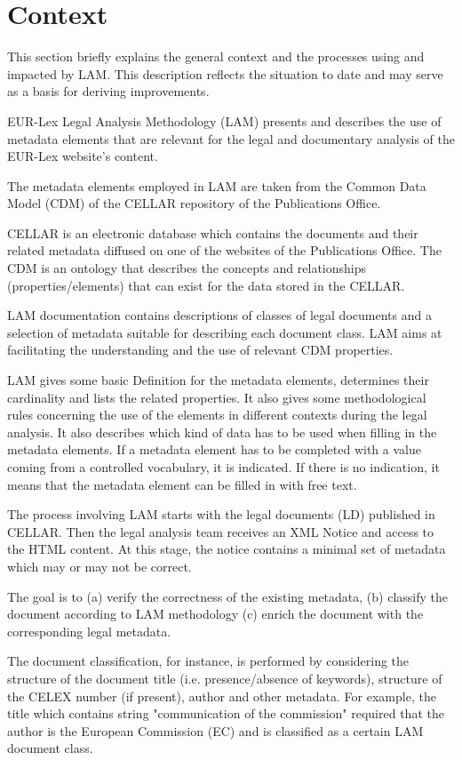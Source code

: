 
\section{Context}\label{ariaid-title1}

This section briefly explains the general context and the processes
using and impacted by LAM. This description reflects the situation to
date and may serve as a basis for deriving improvements.

EUR-Lex Legal Analysis Methodology (LAM) presents and describes the use
of metadata elements that are relevant for the legal and documentary
analysis of the EUR-Lex website's content.

The metadata elements employed in LAM are taken from the Common Data
Model (CDM) of the CELLAR repository of the Publications Office.

CELLAR is an electronic database which contains the documents and their
related metadata diffused on one of the websites of the Publications
Office. The CDM is an ontology that describes the concepts and
relationships (properties/elements) that can exist for the data stored
in the CELLAR.

LAM documentation contains descriptions of classes of legal documents
and a selection of metadata suitable for describing each document class.
LAM aims at facilitating the understanding and the use of relevant CDM
properties.

LAM gives some basic Definition for the metadata elements, determines
their cardinality and lists the related properties. It also gives some
methodological rules concerning the use of the elements in different
contexts during the legal analysis. It also describes which kind of data
has to be used when filling in the metadata elements. If a metadata
element has to be completed with a value coming from a controlled
vocabulary, it is indicated. If there is no indication, it means that
the metadata element can be filled in with free text.

The process involving LAM starts with the legal documents (LD) published
in CELLAR. Then the legal analysis team receives an XML Notice and
access to the HTML content. At this stage, the notice contains a minimal
set of metadata which may or may not be correct.

The goal is to (a) verify the correctness of the existing metadata, (b)
classify the document according to LAM methodology (c) enrich the
document with the corresponding legal metadata.

The document classification, for instance, is performed by considering
the structure of the document title (i.e. presence/absence of keywords),
structure of the CELEX number (if present), author and other metadata.
For example, the title which contains string "communication of the
commission" required that the author is the European Commission (EC) and
is classified as a certain LAM document class.

